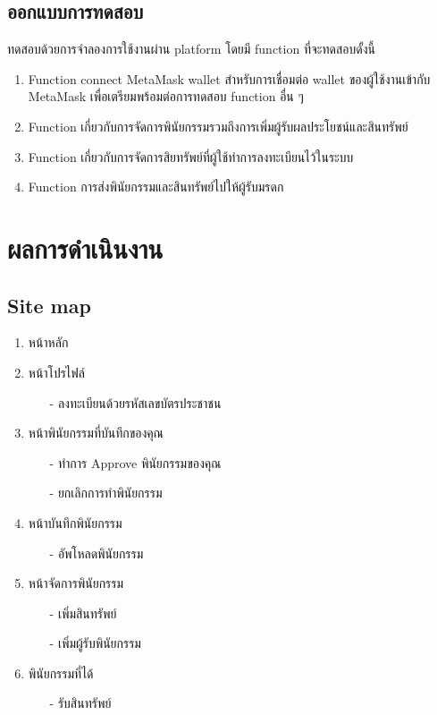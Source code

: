 \documentclass[12pt,oneside,openright,a4paper]{cpe-thai-project}
\begin{document}
\section{ออกแบบการทดสอบ}
\tab ทดสอบด้วยการจำลองการใช้งานผ่าน platform โดยมี function ที่จะทดสอบดั้งนี้
	\begin{enumerate}[label=\thesection.\arabic*,leftmargin=0pt,itemindent=1.25cm]
		\item Function connect MetaMask wallet สําหรับการเชื่อมต่อ wallet ของผู้ใช้งานเข้ากับ MetaMask เพื่อเตรียมพร้อมต่อการทดสอบ function อื่น ๆ
		\item Function เกี่ยวกับการจัดการพินัยกรรมรวมถึงการเพิ่มผู้รับผลประโยชน์และสินทรัพย์ 
		\item Function เกี่ยวกับการจัดการสิยทรัพย์ที่ผู้ใช้ทำการลงทะเบียนไว้ในระบบ
		\item Function การส่งพินัยกรรมและสินทรัพย์ไปให้ผู้รับมรดก
	\end{enumerate}

\chapter{ผลการดําเนินงาน}
\section{Site map}
\begin{enumerate}[label=\thesection.\arabic*,leftmargin=0pt,itemindent=1.25cm]
	\item หน้าหลัก
	\item หน้าโปรไฟล์
	\begin{itemize}[leftmargin=0pt,itemindent=1.25cm]
		\item[-] ลงทะเบียนด้วยรหัสเลขบัตรประชาชน
	\end{itemize}
	\item หน้าพินัยกรรมที่บันทึกของคุณ
	\begin{itemize}[leftmargin=0pt,itemindent=1.25cm]
		\item[-] ทำการ Approve พินัยกรรมของคุณ
		\item[-] ยกเลิกการทำพินัยกรรม
	\end{itemize}
	\item หน้าบันทึกพินัยกรรม 
	\begin{itemize}[leftmargin=0pt,itemindent=1.25cm]
		\item[-] อัพโหลดพินัยกรรม
	\end{itemize}
	\item หน้าจัดการพินัยกรรม
	\begin{itemize}[leftmargin=0pt,itemindent=1.25cm]
		\item[-] เพิ่มสินทรัพย์
		\item[-] เพิ่มผู้รับพินัยกรรม
	\end{itemize}
	\item พินัยกรรมที่ได้
	\begin{itemize}[leftmargin=0pt,itemindent=1.25cm]
		\item[-] รับสินทรัพย์
	\end{itemize}
\end{enumerate}
\end{document}
